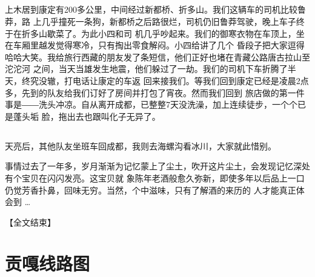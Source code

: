﻿\documentclass[hyperref={bookmarks=ture}xcolor=pdflatex,svgnames,table,compress]{beamer}
\begin{document}
\subsection{}
\begin{frame}
\begin{ztebox} 
{\footnotesize 
上木居到康定有200多公里，中间经过新都桥、折多山。我们这辆车的司机比较鲁莽，路
      上几乎撞死一条狗，新都桥之后路很烂，司机仍旧鲁莽驾驶，晚上车子终于在折多山歇菜了。为此小四和司
      机几乎吵起来。我们的御寒衣物在车顶上，坐在车厢里越发觉得寒冷，只有掏出零食解闷。小四给讲了几个
      昏段子把大家逗得哈哈大笑。我给旅行西藏的朋友发了条短信，他们正好也堵在青藏公路唐古拉山至沱沱河
      之间，当天当雄发生地震，他们躲过了一劫。我们的司机下车折腾了半天，终究没辙，打电话让康定的车返
      回来接我们。等我们回到康定已经是凌晨2点多，先到的队友给我们订好了房间并打包了宵夜。然而我们回到
      旅店做的第一件事是――洗头冲凉。自从离开成都，已整整7天没洗澡，加上连续徒步，一个个已是蓬头垢
      脸，拖出去也跟叫化子无异了。}
\end{ztebox}
\end{frame}

\subsection{}
\begin{frame}
\begin{ztebox} 
{\footnotesize
天亮后，其他队友坐班车回成都，我则去海螺沟看冰川，大家就此惜别。

事情过去了一年多，岁月渐渐为记忆蒙上了尘土，吹开这片尘土，会发现记忆深处有个宝贝在闪闪发亮。这宝贝就
象陈年老酒般愈久弥新，即使多年以后品上一口仍觉芳香扑鼻，回味无穷。当然，个中滋味，只有了解酒的来历的
人才能真正体会到 \ldots
}
\end{ztebox}
\begin{ztebox} 
{\footnotesize
\begin{center}
【全文结束】
\end{center}
}
\end{ztebox}
\end{frame}

\section{贡嘎线路图}
\subsection{}
\begin{frame}
\end{frame}
\end{document}
